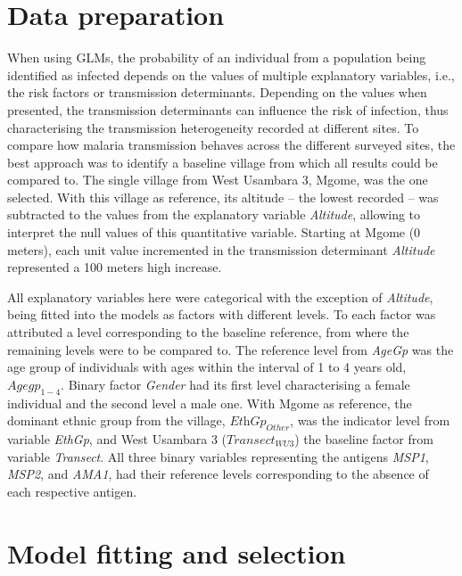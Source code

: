 \section{Data preparation}

When using GLMs, the probability of an individual from a population being identified as infected depends on the values of multiple explanatory variables, i.e., the risk factors or transmission determinants.
Depending on the values when presented, the transmission determinants can influence the risk of infection, thus characterising the transmission heterogeneity recorded at different sites.
To compare how malaria transmission behaves across the different surveyed sites, the best approach was to identify a baseline village from which all results could be compared to.
The single village from West Usambara 3, Mgome, was the one selected.
With this village as reference, its altitude -- the lowest recorded -- was subtracted to the values from the explanatory variable \textit{Altitude}, allowing to interpret the null values of this quantitative variable.
Starting at Mgome (0 meters), each unit value incremented in the transmission determinant \textit{Altitude} represented a 100 meters high increase.


All explanatory variables here were categorical with the exception of \textit{Altitude}, being fitted into the models as factors with different levels.
To each factor was attributed a level corresponding to the baseline reference, from where the remaining levels were to be compared to.
The reference level from \textit{AgeGp} was the age group of individuals with ages within the interval of 1 to 4 years old, $\textit{Agegp}_{1-4}$.
Binary factor \textit{Gender} had its first level characterising a female individual and the second level a male one.
With Mgome as reference, the dominant ethnic group from the village, $\textit{EthGp}_{Other}$, was the indicator level from variable \textit{EthGp}, and West Usambara 3 ($\textit{Transect}_{WU3}$) the baseline factor from variable \textit{Transect}.
All three binary variables representing the antigens \textit{MSP1}, \textit{MSP2}, and \textit{AMA1}, had their reference levels corresponding to the absence of each respective antigen.

\section{Model fitting and selection}

